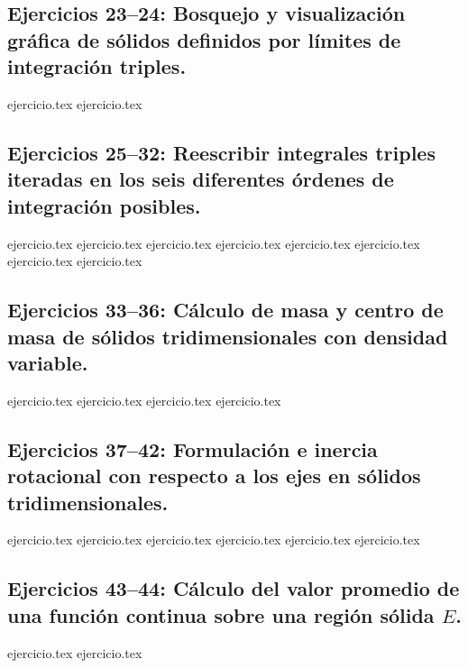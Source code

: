 \subsection*{Ejercicios 23--24: Bosquejo y visualización gráfica de sólidos definidos por límites de integración triples.}
\begin{enumerate}
    \setcounter{enumi}{22}
    {ejercicio.tex}
    {ejercicio.tex}
\end{enumerate}

\subsection*{Ejercicios 25--32: Reescribir integrales triples iteradas en los seis diferentes órdenes de integración posibles.}
\begin{enumerate}
    \setcounter{enumi}{24}
    {ejercicio.tex}
    {ejercicio.tex}
    {ejercicio.tex}
    {ejercicio.tex}
    {ejercicio.tex}
    {ejercicio.tex}
    {ejercicio.tex}
    {ejercicio.tex}
\end{enumerate}

\subsection*{Ejercicios 33--36: Cálculo de masa y centro de masa de sólidos tridimensionales con densidad variable.}
\begin{enumerate}
    \setcounter{enumi}{32}
    {ejercicio.tex}
    {ejercicio.tex}
    {ejercicio.tex}
    {ejercicio.tex}
\end{enumerate}

\subsection*{Ejercicios 37--42: Formulación e inercia rotacional con respecto a los ejes en sólidos tridimensionales.}
\begin{enumerate}
    \setcounter{enumi}{36}
    {ejercicio.tex}
    {ejercicio.tex}
    {ejercicio.tex}
    {ejercicio.tex}
    {ejercicio.tex}
    {ejercicio.tex}
\end{enumerate}

\subsection*{Ejercicios 43--44: Cálculo del valor promedio de una función continua sobre una región sólida $E$.}
\begin{enumerate}
    \setcounter{enumi}{42}
    {ejercicio.tex}
    {ejercicio.tex}
\end{enumerate}

